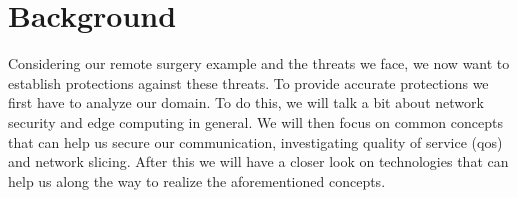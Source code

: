 \chapter{Background}
\label{background}

Considering our remote surgery example and the threats we face, we now want to establish protections against these threats. To provide accurate protections we first have to analyze our domain. To do this, we will talk a bit about network security and edge computing in general. We will then focus on common concepts that can help us secure our communication, investigating quality of service (\acrshort{qos}) and network slicing. After this we will have a closer look on technologies that can help us along the way to realize the aforementioned concepts.

